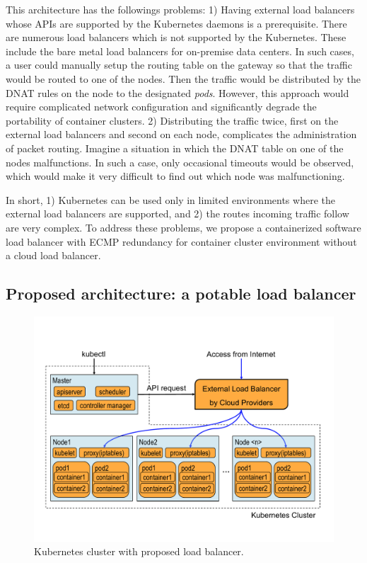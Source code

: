 This architecture has the followings problems: 
1) Having external load balancers whose APIs are supported by the Kubernetes daemons is a prerequisite. 
There are numerous load balancers which is not supported by the Kubernetes.
These include the bare metal load balancers for on-premise data centers.  
In such cases, a user could manually setup the routing table on the gateway so that the traffic would be routed to one of the nodes.
Then the traffic would be distributed by the DNAT rules on the node to the designated {\em pods}.
However, this approach would require complicated network configuration and significantly degrade the portability of container clusters.
2) Distributing the traffic twice, first on the external load balancers and second on each node, 
complicates the administration of packet routing. 
Imagine a situation in which the DNAT table on one of the nodes malfunctions.
In such a case, only occasional timeouts would be observed, which would make it very difficult to find out which node was malfunctioning.   

In short, 1) Kubernetes can be used only in limited environments where the external load balancers are supported, 
and 2) the routes incoming traffic follow are very complex.
%
To address these problems, we propose a containerized software load balancer with ECMP redundancy for container cluster environment without a cloud load balancer.

\subsection{Proposed architecture: a potable load balancer}

\begin{figure}
\includegraphics[width=\columnwidth]{Figs/K8sProposed}
\caption{Kubernetes cluster with proposed load balancer.}
\label{fig:K8sProposed}
\end{figure}

